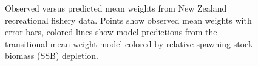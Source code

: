 \documentclass[
  11pt,
]{SCreport}
\begin{document}
\begin{figure}[H]


\caption{\label{fig-gedamke}Observed versus predicted mean weights from
New Zealand recreational fishery data. Points show observed mean weights
with error bars, colored lines show model predictions from the
transitional mean weight model colored by relative spawning stock
biomass (SSB) depletion.}

\end{figure}%

\newpage
\end{document}
